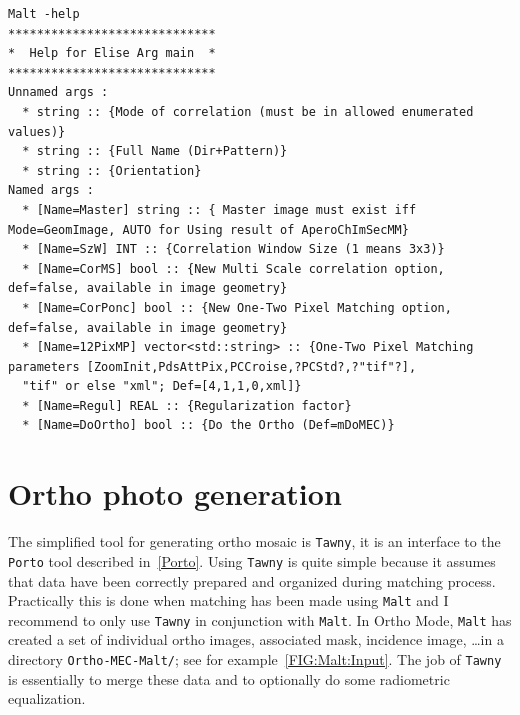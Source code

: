 {
\begin{verbatim}
Malt -help
*****************************
*  Help for Elise Arg main  *
*****************************
Unnamed args :
  * string :: {Mode of correlation (must be in allowed enumerated values)}
  * string :: {Full Name (Dir+Pattern)}
  * string :: {Orientation}
Named args :
  * [Name=Master] string :: { Master image must exist iff Mode=GeomImage, AUTO for Using result of AperoChImSecMM}
  * [Name=SzW] INT :: {Correlation Window Size (1 means 3x3)}
  * [Name=CorMS] bool :: {New Multi Scale correlation option, def=false, available in image geometry}
  * [Name=CorPonc] bool :: {New One-Two Pixel Matching option, def=false, available in image geometry}
  * [Name=12PixMP] vector<std::string> :: {One-Two Pixel Matching parameters [ZoomInit,PdsAttPix,PCCroise,?PCStd?,?"tif"?], 
  "tif" or else "xml"; Def=[4,1,1,0,xml]}
  * [Name=Regul] REAL :: {Regularization factor}
  * [Name=DoOrtho] bool :: {Do the Ortho (Def=mDoMEC)}
\end{verbatim}
}

 



\section{Ortho photo generation}

The simplified tool for generating ortho mosaic is {\tt Tawny}, it is
an interface to the {\tt Porto} tool described in~\ref{Porto}.
Using {\tt Tawny} is quite simple because it assumes that data have been correctly prepared and organized during matching
process. Practically this is done when matching has been made using
{\tt Malt} and I recommend to only use {\tt Tawny} in conjunction with
{\tt Malt}. In Ortho Mode, {\tt Malt} has created a set of
individual ortho images, associated mask, incidence image, \dots in
a directory {\tt Ortho-MEC-Malt/}; see for example~\ref{FIG:Malt:Input}.
 The job of {\tt Tawny} is essentially to merge these data and to optionally do some
radiometric equalization.



